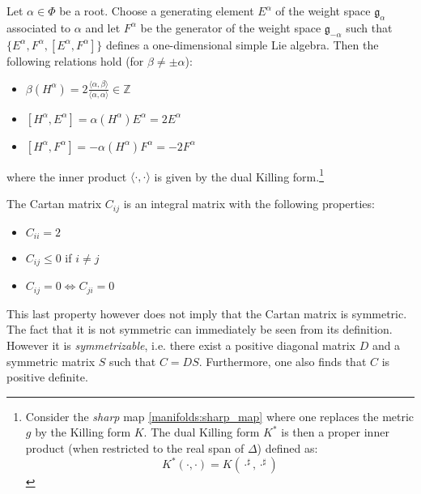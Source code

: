     \begin{property}
        Let $\alpha\in\Phi$ be a root. Choose a generating element $E^\alpha$ of the weight space $\mathfrak{g}_\alpha$ associated to $\alpha$ and let $F^\alpha$ be the generator of the weight space $\mathfrak{g}_{-\alpha}$ such that $\{E^\alpha, F^\alpha, [E^\alpha, F^\alpha]\}$ defines a one-dimensional simple Lie algebra. Then the following relations hold (for $\beta\neq\pm\alpha$):
        \begin{itemize}
            \item $\beta(H^\alpha) = 2\frac{\langle\alpha, \beta\rangle}{\langle\alpha, \alpha\rangle}\in\mathbb{Z}$
            \item $[H^\alpha, E^\alpha] = \alpha(H^\alpha)E^\alpha = 2E^\alpha$
            \item $[H^\alpha, F^\alpha] = -\alpha(H^\alpha)F^\alpha = -2F^\alpha$
        \end{itemize}
        where the inner product $\langle\cdot,\cdot\rangle$ is given by the dual Killing form.\footnote{Consider the \textit{sharp} map \ref{manifolds:sharp_map} where one replaces the metric $g$ by the Killing form $K$. The dual Killing form $K^*$ is then a proper inner product (when restricted to the real span of $\Delta$) defined as: \[K^*(\cdot, \cdot) = K(\cdot^\sharp, \cdot^\sharp)\]}
    \end{property}

    \begin{property}\label{lie:cartan_prop}
        The Cartan matrix $C_{ij}$ is an integral matrix with the following properties:
        \begin{itemize}
            \item $C_{ii} = 2$
            \item $C_{ij} \leq 0$ if $i\neq j$
            \item $C_{ij} = 0\iff C_{ji} = 0$
        \end{itemize}
        This last property however does not imply that the Cartan matrix is symmetric. The fact that it is not symmetric can immediately be seen from its definition. However it is \textit{symmetrizable}, i.e. there exist a positive diagonal matrix $D$ and a symmetric matrix $S$ such that $C = DS$. Furthermore, one also finds that $C$ is positive definite.
    \end{property}

